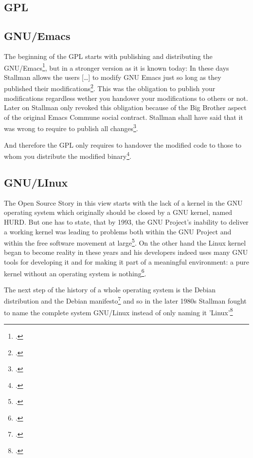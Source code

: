 \documentclass[DIV=calc,BCOR=5mm,11pt,headings=small,oneside,abstract=true, toc=bib]{scrartcl}
\begin{document}
\subsection{GPL}

\subsection{GNU/Emacs}

The beginning of the GPL starts with publishing and distributing the
GNU/Emacs\footcite[cf][123]{Williams2002a}, but in a stronger version as it is
known today: In these days Stallman allows the users \glqq{}[\ldots] to
modify GNU Emacs just so long as they published their
modifications\grqq{}\footcite[cf][124]{Williams2002a}. This was the obligation
to publish your modifications regardless wether you handover your modifications
to others or not. Later on Stallman only revoked this obligation because of the
\glqq{}Big Brother aspect of the original Emacs Commune social contract\grqq{}.
Stallman shall have said that \glqq{}it was wrong to require to publish all
changes\grqq{}\footcite[cf][127]{Williams2002a}.

And therefore the GPL only requires to handover the modified code to those  to
whom you distribute the modified  binary\footcite[cf][128ff]{Williams2002a}.

\subsection{GNU/LInux}

The Open Source Story in this view starts with the lack of a kernel in the GNU
operating system which originally should be closed by a GNU kernel, named
\glqq{}HURD\grqq{}. But one has to state, that \glqq{}by 1993, the GNU Project's
inability to deliver a working kernel was leading to problems both within the
GNU Project and within the free software movement at
large\grqq{}\footcite[cf][145]{Williams2002a}. On the other hand the Linux
kernel began to become reality in these years
and his developers indeed uses many GNU
tools for developing it and for making it part of
a meaningful environment: a pure kernel without an
operating system is nothing\footcite[cf][143]{Williams2002a}.

The next step of the history of a whole operating system is the Debian
distribution and the Debian manifesto\footcite[cf][147]{Williams2002a} and so in
the later 1980s Stallman fought to name the complete system GNU/Linux instead of
only naming it 'Linux'\footcite[cf][149f]{Williams2002a}
\end{document}
